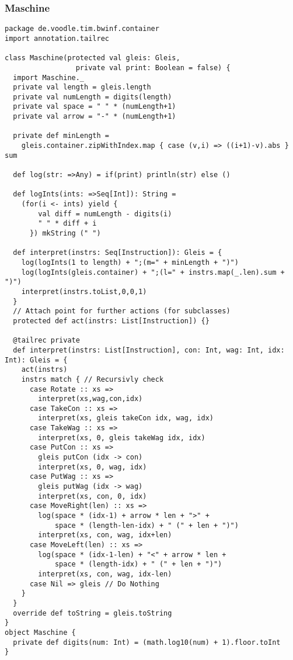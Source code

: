 \subsubsection{Maschine}
\begin{lstlisting}
package de.voodle.tim.bwinf.container
import annotation.tailrec

class Maschine(protected val gleis: Gleis,
                 private val print: Boolean = false) {
  import Maschine._
  private val length = gleis.length
  private val numLength = digits(length)
  private val space = " " * (numLength+1)
  private val arrow = "-" * (numLength+1)

  private def minLength =
    gleis.container.zipWithIndex.map { case (v,i) => ((i+1)-v).abs } sum

  def log(str: =>Any) = if(print) println(str) else ()
  
  def logInts(ints: =>Seq[Int]): String =
    (for(i <- ints) yield {
        val diff = numLength - digits(i)
        " " * diff + i
      }) mkString (" ")

  def interpret(instrs: Seq[Instruction]): Gleis = {
    log(logInts(1 to length) + ";(m=" + minLength + ")")
    log(logInts(gleis.container) + ";(l=" + instrs.map(_.len).sum + ")")
    interpret(instrs.toList,0,0,1)
  }
  // Attach point for further actions (for subclasses)
  protected def act(instrs: List[Instruction]) {}
  
  @tailrec private
  def interpret(instrs: List[Instruction], con: Int, wag: Int, idx: Int): Gleis = {
    act(instrs)
    instrs match { // Recursivly check
      case Rotate :: xs =>
        interpret(xs,wag,con,idx)
      case TakeCon :: xs =>
        interpret(xs, gleis takeCon idx, wag, idx)
      case TakeWag :: xs =>
        interpret(xs, 0, gleis takeWag idx, idx)
      case PutCon :: xs =>
        gleis putCon (idx -> con)
        interpret(xs, 0, wag, idx)
      case PutWag :: xs =>
        gleis putWag (idx -> wag)
        interpret(xs, con, 0, idx)
      case MoveRight(len) :: xs =>
        log(space * (idx-1) + arrow * len + ">" +
            space * (length-len-idx) + " (" + len + ")")
        interpret(xs, con, wag, idx+len)
      case MoveLeft(len) :: xs =>
        log(space * (idx-1-len) + "<" + arrow * len +
            space * (length-idx) + " (" + len + ")")
        interpret(xs, con, wag, idx-len)
      case Nil => gleis // Do Nothing
    }
  }
  override def toString = gleis.toString
}
object Maschine {
  private def digits(num: Int) = (math.log10(num) + 1).floor.toInt
}
\end{lstlisting}
\newpage
